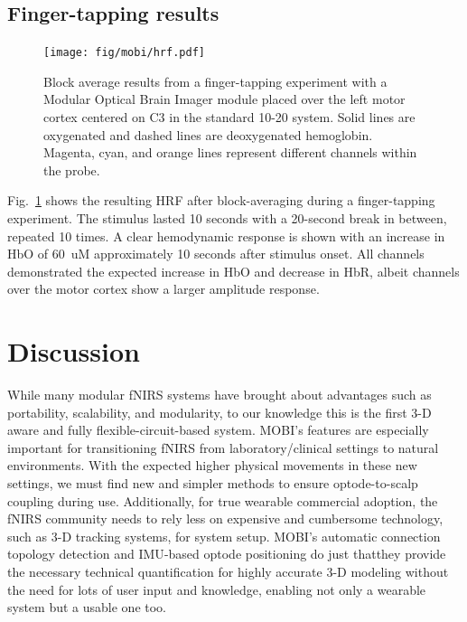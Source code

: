 \subsection{Finger-tapping results}
\begin{figure}
	\begin{center}
	\texttt{[image: fig/mobi/hrf.pdf]}
	\end{center}
	\caption{Block average results from a finger-tapping experiment with a Modular Optical Brain Imager module placed over the left motor cortex centered on C3 in the standard 10-20 system. Solid lines are oxygenated and dashed lines are deoxygenated hemoglobin. Magenta, cyan, and orange lines represent different channels within the probe.}
	\label{fig:hrf}
\end{figure} 
Fig.~\ref{fig:hrf} shows the resulting \ac{HRF} after block-averaging during a finger-tapping experiment. The stimulus lasted 10 seconds with a 20-second break in between, repeated 10 times. A clear hemodynamic response is shown with an increase in \ac{HbO} of 60~uM approximately 10 seconds after stimulus onset. All channels demonstrated the expected increase in \ac{HbO} and decrease in \ac{HbR}, albeit channels over the motor cortex show a larger amplitude response. 



\section{Discussion}
\label{chap:mobi:discussion}
While many modular \ac{fNIRS} systems have brought about advantages such as portability, scalability, and modularity, to our knowledge this is the first 3-D aware and fully flexible-circuit-based system. \ac{MOBI}'s features are especially important for transitioning \ac{fNIRS} from laboratory/clinical settings to natural environments. With the expected higher physical movements in these new settings, we must find new and simpler methods to ensure optode-to-scalp coupling during use. Additionally, for true wearable commercial adoption, the \ac{fNIRS} community needs to rely less on expensive and cumbersome technology, such as 3-D tracking systems, for system setup. \ac{MOBI}'s automatic connection topology detection and \ac{IMU}-based optode positioning do just that\textemdash they provide the necessary technical quantification for highly accurate 3-D modeling without the need for lots of user input and knowledge, enabling not only a wearable system but a usable one too. 

